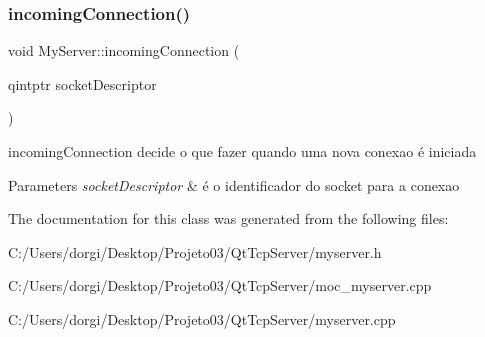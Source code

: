 \subsubsection{\texorpdfstring{incoming\+Connection()}{incomingConnection()}}
{\footnotesize\ttfamily void My\+Server\+::incoming\+Connection (\begin{DoxyParamCaption}\item[{qintptr}]{socket\+Descriptor }\end{DoxyParamCaption})\hspace{0.3cm}{\ttfamily [protected]}}



incoming\+Connection decide o que fazer quando uma nova conexao é iniciada 


\begin{DoxyParams}{Parameters}
{\em socket\+Descriptor} & é o identificador do socket para a conexao \\
\hline
\end{DoxyParams}


The documentation for this class was generated from the following files\+:\begin{DoxyCompactItemize}
\item 
C\+:/\+Users/dorgi/\+Desktop/\+Projeto03/\+Qt\+Tcp\+Server/myserver.\+h\item 
C\+:/\+Users/dorgi/\+Desktop/\+Projeto03/\+Qt\+Tcp\+Server/moc\+\_\+myserver.\+cpp\item 
C\+:/\+Users/dorgi/\+Desktop/\+Projeto03/\+Qt\+Tcp\+Server/myserver.\+cpp\end{DoxyCompactItemize}
